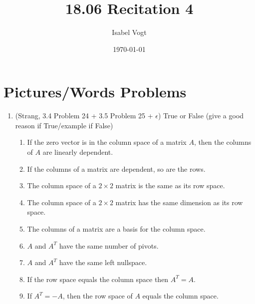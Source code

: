 \documentclass[11pt]{article}
\title{18.06 Recitation 4}
\author{Isabel Vogt}
\date{\today}                                           %
\begin{document}
\maketitle
\section{Pictures/Words Problems}

\begin{enumerate}


\item (Strang, 3.4 Problem 24 + 3.5 Problem 25 + $\epsilon$) True or False (give a good reason if True/example if False)

\begin{enumerate}

\item If the zero vector is in the column space of a matrix $A$, then the columns of $A$ are linearly dependent.

\item If the columns of a matrix are dependent, so are the rows.

\item The column space of a $2 \times 2$ matrix is the same as its row space.

\item The column space of a $2 \times 2$ matrix has the same dimension as its row space.

\item The columns of a matrix are a basis for the column space.

\item $A$ and $A^T$ have the same number of pivots.

\item $A$ and $A^T$ have the same left nullspace.

\item If the row space equals the column space then $A^T=A$.

\item If $A^T = -A$, then the row space of $A$ equals the column space.

\end{enumerate}


\end{enumerate}
\end{document}
